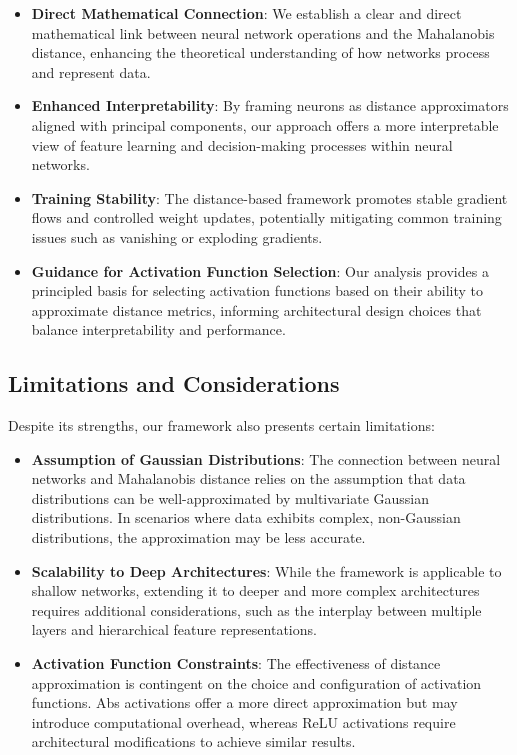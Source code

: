 \begin{itemize}
    \item \textbf{Direct Mathematical Connection}: We establish a clear and direct mathematical link between neural network operations and the Mahalanobis distance, enhancing the theoretical understanding of how networks process and represent data.
    
    \item \textbf{Enhanced Interpretability}: By framing neurons as distance approximators aligned with principal components, our approach offers a more interpretable view of feature learning and decision-making processes within neural networks.
    
    \item \textbf{Training Stability}: The distance-based framework promotes stable gradient flows and controlled weight updates, potentially mitigating common training issues such as vanishing or exploding gradients.
    
    \item \textbf{Guidance for Activation Function Selection}: Our analysis provides a principled basis for selecting activation functions based on their ability to approximate distance metrics, informing architectural design choices that balance interpretability and performance.
\end{itemize}

\subsection{Limitations and Considerations}

Despite its strengths, our framework also presents certain limitations:

\begin{itemize}
    \item \textbf{Assumption of Gaussian Distributions}: The connection between neural networks and Mahalanobis distance relies on the assumption that data distributions can be well-approximated by multivariate Gaussian distributions. In scenarios where data exhibits complex, non-Gaussian distributions, the approximation may be less accurate.
    
    \item \textbf{Scalability to Deep Architectures}: While the framework is applicable to shallow networks, extending it to deeper and more complex architectures requires additional considerations, such as the interplay between multiple layers and hierarchical feature representations.
    
    \item \textbf{Activation Function Constraints}: The effectiveness of distance approximation is contingent on the choice and configuration of activation functions. Abs activations offer a more direct approximation but may introduce computational overhead, whereas ReLU activations require architectural modifications to achieve similar results.
\end{itemize}

